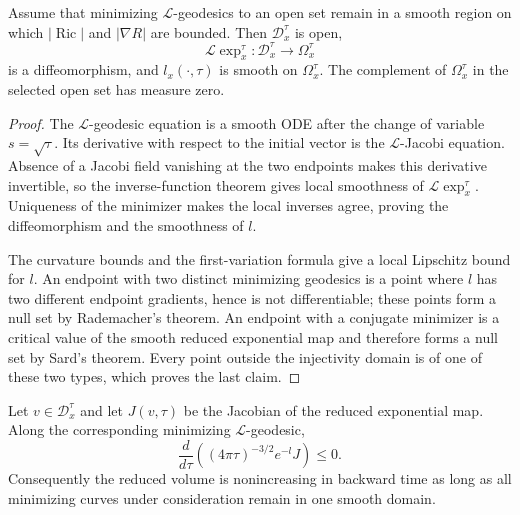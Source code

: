 \begin{theorem}
\label{thm:reduced-exponential-regularity}
\notready
Assume that minimizing $\mathcal L$-geodesics to an open set remain in a
smooth region on which $|\operatorname{Ric}|$ and $|\nabla R|$ are bounded.
Then $\mathcal D_x^\tau$ is open,
\[
 \mathcal L\exp_x^\tau\colon\mathcal D_x^\tau
 \longrightarrow\Omega_x^\tau
\]
is a diffeomorphism, and $l_x(\cdot,\tau)$ is smooth on
$\Omega_x^\tau$.  The complement of $\Omega_x^\tau$ in the selected open
set has measure zero.
\end{theorem}

\begin{proof}
The $\mathcal L$-geodesic equation is a smooth ODE after the change of
variable $s=\sqrt\tau$.  Its derivative with respect to the initial vector is
the $\mathcal L$-Jacobi equation.  Absence of a Jacobi field vanishing at the
two endpoints makes this derivative invertible, so the inverse-function
theorem gives local smoothness of $\mathcal L\exp_x^\tau$.  Uniqueness of the
minimizer makes the local inverses agree, proving the diffeomorphism and the
smoothness of $l$.

The curvature bounds and the first-variation formula give a local Lipschitz
bound for $l$.  An endpoint with two distinct minimizing geodesics is a point
where $l$ has two different endpoint gradients, hence is not differentiable;
these points form a null set by Rademacher's theorem.  An endpoint with a
conjugate minimizer is a critical value of the smooth reduced exponential map
and therefore forms a null set by Sard's theorem.  Every point outside the
injectivity domain is of one of these two types, which proves the last claim.
\end{proof}

\begin{lemma}
\label{lem:reduced-density-monotonicity}
\notready
Let $v\in\mathcal D_x^\tau$ and let $J(v,\tau)$ be the Jacobian of the
reduced exponential map.  Along the corresponding minimizing
$\mathcal L$-geodesic,
\[
 \frac d{d\tau}\left((4\pi\tau)^{-3/2}e^{-l}J\right)\le0.
\]
Consequently the reduced volume is nonincreasing in backward time as long as
all minimizing curves under consideration remain in one smooth domain.
\end{lemma}

